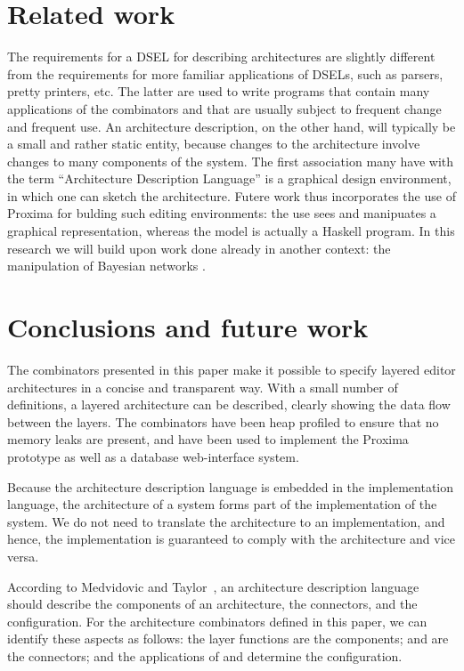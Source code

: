 \documentclass{llncs}
\begin{document}
\bc
%																
%																
%																
\section{Related work} \label{sect:relatedWork}


The requirements for a DSEL for describing architectures are slightly different from the requirements for more familiar applications of DSELs, such as parsers, pretty printers, etc. The latter are used to write programs that contain many applications of the combinators and that are usually subject to frequent change and frequent use. An architecture description, on the other hand, will typically be a small and rather static entity, because changes to the architecture involve changes to many components of the system. The first association many have with the term ``Architecture Description Language'' is a graphical design environment, in which one can sketch the architecture. Futere work thus incorporates the use of Proxima for bulding such editing environments: the use sees and manipuates a graphical representation, whereas the model is actually a Haskell program. In this research we will build upon work done already in another context: the manipulation of Bayesian networks \cite{schrage05Dazzle}. 
\ec



%																
%																
%																
\section{Conclusions and future work} \label{sect:conclusions}

The combinators presented in this paper make it possible to specify layered editor architectures in a concise and transparent way. With a small number of definitions, a layered architecture can be described, clearly showing the data flow between the layers. The combinators have been heap profiled to ensure that no memory leaks are present, and have been used to implement the Proxima prototype as well as a database web-interface system.

Because the architecture description language is embedded in the implementation language, the architecture of a system forms part of the implementation of the system. We do not need to translate the architecture to an implementation, and hence, the implementation is guaranteed to comply with the architecture and vice versa.

According to Medvidovic and Taylor~\cite{medvidovic00ADLs}, an architecture description language should describe the components of an architecture, the connectors, and the configuration. For the architecture combinators defined in this paper, we can identify these aspects as follows: the layer functions are the components;  and  are the connectors; and the applications of  and  determine the configuration.
\end{document}

